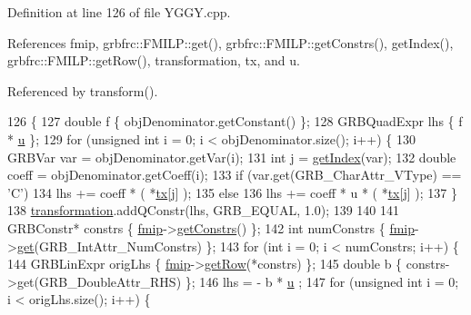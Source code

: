 Definition at line 126 of file Y\+G\+G\+Y.\+cpp.



References fmip, grbfrc\+::\+F\+M\+I\+L\+P\+::get(), grbfrc\+::\+F\+M\+I\+L\+P\+::get\+Constrs(), get\+Index(), grbfrc\+::\+F\+M\+I\+L\+P\+::get\+Row(), transformation, tx, and u.



Referenced by transform().


\begin{DoxyCode}
126                                                         \{
127     \textcolor{keywordtype}{double} f \{ objDenominator.getConstant() \};
128     GRBQuadExpr lhs \{ f * \hyperlink{classgrbfrc_1_1YGGY_a1c24782afe02686a8eabc59b829cdec0}{u} \};
129     \textcolor{keywordflow}{for} (\textcolor{keywordtype}{unsigned} \textcolor{keywordtype}{int} i = 0; i < objDenominator.size(); i++) \{
130       GRBVar var = objDenominator.getVar(i);
131       \textcolor{keywordtype}{int} j = \hyperlink{classgrbfrc_1_1YGGY_ac927b33921438e06b02a766b134d2089}{getIndex}(var);
132       \textcolor{keywordtype}{double} coeff = objDenominator.getCoeff(i);
133       \textcolor{keywordflow}{if} (var.get(GRB\_CharAttr\_VType) == \textcolor{charliteral}{'C'})
134           lhs += coeff * ( *\hyperlink{classgrbfrc_1_1YGGY_a1c58fb733dc53d1bf8823623aaf297f8}{tx}[j] );
135       \textcolor{keywordflow}{else}
136           lhs += coeff * u * ( *\hyperlink{classgrbfrc_1_1YGGY_a1c58fb733dc53d1bf8823623aaf297f8}{tx}[j] );
137     \}
138     \hyperlink{classgrbfrc_1_1YGGY_a6f528d327b9dfbe474d357afe8a3d518}{transformation}.addQConstr(lhs, GRB\_EQUAL, 1.0);
139 
140 
141     GRBConstr* constrs \{ \hyperlink{classgrbfrc_1_1YGGY_aa4f63c22c95cd48cd87756ebc5de53aa}{fmip}->\hyperlink{classgrbfrc_1_1FMILP_aa6a2087036235f6255f9f779e2303768}{getConstrs}() \};
142     \textcolor{keywordtype}{int} numConstrs \{ \hyperlink{classgrbfrc_1_1YGGY_aa4f63c22c95cd48cd87756ebc5de53aa}{fmip}->\hyperlink{classgrbfrc_1_1FMILP_a5f74659534b60535f4cacce86ac94c23}{get}(GRB\_IntAttr\_NumConstrs) \};
143     \textcolor{keywordflow}{for} (\textcolor{keywordtype}{int} i = 0; i < numConstrs; i++) \{
144       GRBLinExpr origLhs \{ \hyperlink{classgrbfrc_1_1YGGY_aa4f63c22c95cd48cd87756ebc5de53aa}{fmip}->\hyperlink{classgrbfrc_1_1FMILP_a13b7ccccee5b9592cb5a15830c0f06c7}{getRow}(*constrs) \};
145       \textcolor{keywordtype}{double} b \{ constrs->get(GRB\_DoubleAttr\_RHS) \};
146       lhs = - b * \hyperlink{classgrbfrc_1_1YGGY_a1c24782afe02686a8eabc59b829cdec0}{u} ;
147       \textcolor{keywordflow}{for} (\textcolor{keywordtype}{unsigned} \textcolor{keywordtype}{int} i = 0; i < origLhs.size(); i++) \{

\end{DoxyCode}
